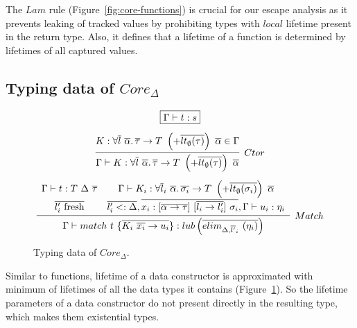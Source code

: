 \documentclass[11pt]{article}
\newcommand{\mathframebox}[1]{\framebox{$\displaystyle #1$}}
\newcommand{\ap}{~}
\begin{document}
    The $Lam$ rule (Figure\ \ref{fig:core-functions}) is crucial for our escape analysis as it prevents leaking of tracked values by prohibiting types with $local$ lifetime present in the return type.
    Also, it defines that a lifetime of a function is determined by lifetimes of all captured values.

    \subsection{Typing data of $Core_\Delta$} \label{subsec:typing-data}

    \begin{figure}
        \begin{gather*}
            \mathframebox{\Gamma\vdash t : s} \\[0.5em]
            \infer[Ctor]{\Gamma\vdash K : \forall\overline{l}\ \overline{\alpha}\ldotp \overline{\tau}\to T \ap\left(+\overline{lt_\emptyset(\tau)}\right)\ap \overline{\alpha}}{K : \forall\overline{l}\ \overline{\alpha}\ldotp \overline{\tau}\to T \ap\left(+\overline{lt_\emptyset(\tau)}\right)\ap \overline{\alpha} \in \Gamma} \\[0.5em]
            \infer[Match]{
                \Gamma\vdash match ~ t ~\{ \overline{K_i\ap \overline{x_{i}} \to u_i }\}  : lub\left(\overline{elim_{\Delta, \overline{l'}_i}\ap(\eta_i)}\right)
            }{
                \begin{array}{cc}
                    \Gamma\vdash t : T\ap\Delta \ap\overline{\tau}
                    &
                    \Gamma\vdash K_i : \forall \overline{l}_i~\overline{\alpha}\ldotp \overline{\sigma_{i}} \to T\ap\left(+\overline{lt_\emptyset(\sigma_i)}\right)\ap\overline{\alpha}
                    \\[0.4em]
                    \overline{l_i' \text{ fresh}}
                    &
                    \overline{l_i' <: \Delta}, \overline{x_i : [\overline{\alpha\to\tau}]\ap[\overline{l_i\to l_i'}]\ap\sigma_i}, \Gamma \vdash u_i : \eta_i
                \end{array}
            }
        \end{gather*}
        \caption{Typing data of $Core_{\Delta}$.}
        \label{fig:core-data-typing}
    \end{figure}

    Similar to functions, lifetime of a data constructor is approximated with minimum of lifetimes of all the data types it contains (Figure\ \ref{fig:core-data-typing}).
    So the lifetime parameters of a data constructor do not present directly in the resulting type, which makes them existential types. %
\end{document}
